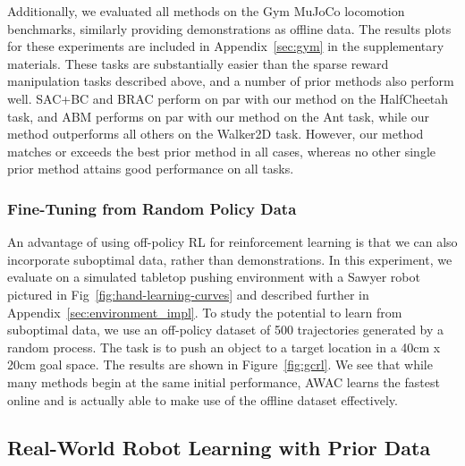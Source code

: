 \documentclass[conference]{IEEEtran}
\begin{document}
Additionally, we evaluated all methods on the Gym MuJoCo locomotion benchmarks, similarly providing demonstrations as offline data. The results plots for these experiments are included in Appendix~\ref{sec:gym} in the supplementary materials. These tasks are substantially easier than the sparse reward manipulation tasks described above, and a number of prior methods also perform well. 
SAC+BC and BRAC perform on par with our method on the HalfCheetah task, and ABM performs on par with our method on the Ant task, while our method outperforms all others on the Walker2D task. 
However, our method matches or exceeds the best prior method in all cases, whereas no other single prior method attains good performance on all tasks.

\subsubsection{Fine-Tuning from Random Policy Data} \label{sec:random_exps}



An advantage of using off-policy RL for reinforcement learning is that we can also incorporate suboptimal data, rather than demonstrations. In this experiment, we evaluate on a simulated tabletop pushing environment with a Sawyer robot pictured in Fig~\ref{fig:hand-learning-curves} and described further in Appendix~\ref{sec:environment_impl}.
To study the potential to learn from suboptimal data, we use an off-policy dataset of 500 trajectories generated by a random process. 
The task is to push an object to a target location in a 40cm x 20cm goal space.
The results are shown in Figure~\ref{fig:gcrl}. We see that while many methods begin at the same initial performance, AWAC learns the fastest online and is actually able to make use of the offline dataset effectively.

\subsection{Real-World Robot Learning with Prior Data} \label{sec:real_world_exps}
\end{document}
